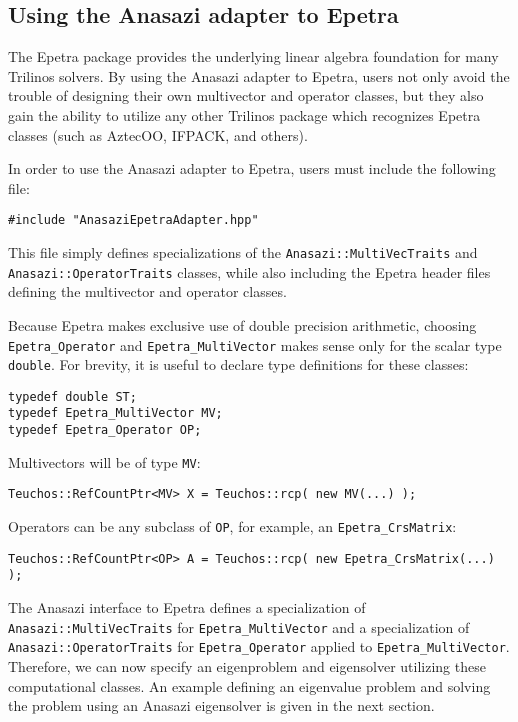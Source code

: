 \subsection{Using the Anasazi adapter to Epetra}
\label{sec:anasazi:epetra}

The Epetra package provides the underlying linear algebra foundation for many
Trilinos solvers.  By using the Anasazi adapter to Epetra, users not only
avoid the trouble of designing their own multivector and operator classes, but
they also gain the ability to utilize any other Trilinos package which
recognizes Epetra classes (such as AztecOO, IFPACK, and others).

In order to use the Anasazi adapter to Epetra, users must include the following
file:
\begin{verbatim}
#include "AnasaziEpetraAdapter.hpp"
\end{verbatim}
This file simply defines specializations of the \verb!Anasazi::MultiVecTraits!
and \verb!Anasazi::OperatorTraits! classes, while also including the Epetra
header files defining the multivector and operator classes.

Because Epetra makes exclusive use of double precision arithmetic, choosing
\verb!Epetra_Operator! and \verb!Epetra_MultiVector! makes sense only for the
scalar type \verb!double!. For brevity, it is useful to declare type definitions
for these classes:
\begin{verbatim}
typedef double ST;
typedef Epetra_MultiVector MV;
typedef Epetra_Operator OP;
\end{verbatim}

Multivectors will be of type \verb!MV!:
\begin{verbatim}
Teuchos::RefCountPtr<MV> X = Teuchos::rcp( new MV(...) );
\end{verbatim}

Operators can be any subclass of \verb!OP!, for example, an \verb!Epetra_CrsMatrix!:
\begin{verbatim}
Teuchos::RefCountPtr<OP> A = Teuchos::rcp( new Epetra_CrsMatrix(...) );
\end{verbatim}

The Anasazi interface to Epetra defines a specialization of
\verb!Anasazi::MultiVecTraits! for \verb!Epetra_MultiVector! and a
specialization of \verb!Anasazi::OperatorTraits! for \verb!Epetra_Operator!
applied to \verb!Epetra_MultiVector!. Therefore, we can now specify an
eigenproblem and eigensolver utilizing these computational classes. An example
defining an eigenvalue problem and solving the problem using an Anasazi
eigensolver is given in the next section.

